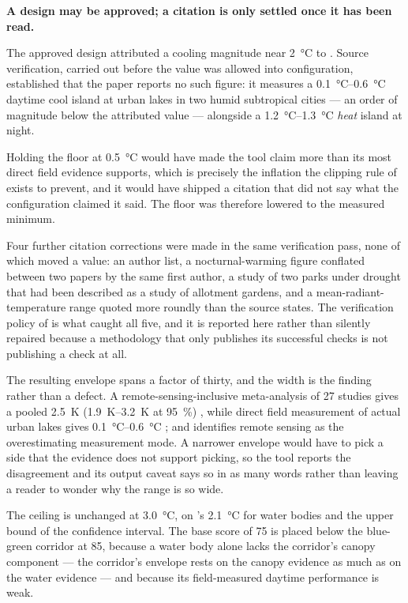 \begin{keynote}
\noindent\textbf{A design may be approved; a citation is only settled once it
has been read.}

The approved design attributed a cooling magnitude near
\qty{2}{\degreeCelsius} to \textcite{yao2023a}. Source verification, carried out
before the value was allowed into configuration, established that the paper
reports no such figure: it measures a \SIrange{0.1}{0.6}{\degreeCelsius}
daytime cool island at urban lakes in two humid subtropical cities --- an order
of magnitude below the attributed value --- alongside a
\SIrange{1.2}{1.3}{\degreeCelsius} \emph{heat} island at night.

Holding the floor at \qty{0.5}{\degreeCelsius} would have made the tool claim
more than its most direct field evidence supports, which is precisely the
inflation the clipping rule of  exists to prevent, and it
would have shipped a citation that did not say what the configuration claimed it
said. The floor was therefore lowered to the measured minimum.

Four further citation corrections were made in the same verification pass, none
of which moved a value: an author list, a nocturnal-warming figure conflated
between two papers by the same first author, a study of two parks under drought
that had been described as a study of allotment gardens, and a
mean-radiant-temperature range quoted more roundly than the source states. The
verification policy of  is what caught all five, and it
is reported here rather than silently repaired because a methodology that only
publishes its successful checks is not publishing a check at all.
\end{keynote}

The resulting envelope spans a factor of thirty, and the width is the finding
rather than a defect. A remote-sensing-inclusive meta-analysis of 27 studies
gives a pooled \qty{2.5}{\kelvin} (\SIrange{1.9}{3.2}{\kelvin} at
\SI{95}{\percent}) \parencite{volker2013}, while direct field measurement of
actual urban lakes gives \SIrange{0.1}{0.6}{\degreeCelsius}
\parencite{yao2023a}; and \textcite{ampatzidis2020} identifies remote sensing
as the overestimating measurement mode. A narrower envelope would have to pick
a side that the evidence does not support picking, so the tool reports the
disagreement and its output caveat says so in as many words rather than leaving
a reader to wonder why the range is so wide.

The ceiling is unchanged at \qty{3.0}{\degreeCelsius}, on
\textcite{keravec2026}'s \qty{2.1}{\degreeCelsius} for water bodies and the
upper bound of the \textcite{volker2013} confidence interval. The base score of
75 is placed below the blue-green corridor at 85, because a water body alone
lacks the corridor's canopy component --- the corridor's envelope rests on the
canopy evidence as much as on the water evidence --- and because its
field-measured daytime performance is weak.

